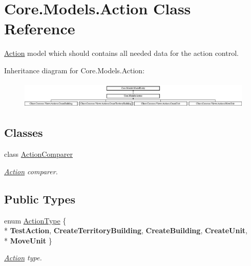 \hypertarget{classCore_1_1Models_1_1Action}{}\section{Core.\+Models.\+Action Class Reference}
\label{classCore_1_1Models_1_1Action}


\hyperlink{classCore_1_1Models_1_1Action}{Action} model which should contains all needed data for the action control.  


Inheritance diagram for Core.\+Models.\+Action\+:\begin{figure}[H]
\begin{center}
\leavevmode
\includegraphics[height=1.296296cm]{classCore_1_1Models_1_1Action}
\end{center}
\end{figure}
\subsection*{Classes}
\begin{DoxyCompactItemize}
\item 
class \hyperlink{classCore_1_1Models_1_1Action_1_1ActionComparer}{Action\+Comparer}
\begin{DoxyCompactList}\small\item\em \hyperlink{classCore_1_1Models_1_1Action}{Action} comparer. \end{DoxyCompactList}\end{DoxyCompactItemize}
\subsection*{Public Types}
\begin{DoxyCompactItemize}
\item 
enum \hyperlink{classCore_1_1Models_1_1Action_a9e9cef4702eef3e7d99f5db15e8c4640}{Action\+Type} \{ \\*
{\bfseries Test\+Action}, 
{\bfseries Create\+Territory\+Building}, 
{\bfseries Create\+Building}, 
{\bfseries Create\+Unit}, 
\\*
{\bfseries Move\+Unit}
 \}\begin{DoxyCompactList}\small\item\em \hyperlink{classCore_1_1Models_1_1Action}{Action} type. \end{DoxyCompactList}
\end{DoxyCompactItemize}
